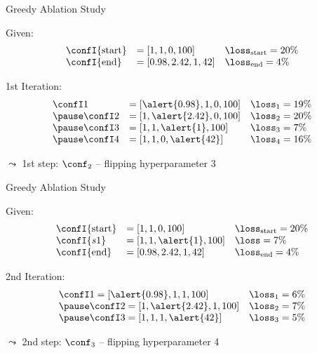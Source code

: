 \begin{frame}[c]{Greedy Ablation Study}

Given:
\begin{eqnarray}
\begin{array}{lll}
\confI{\text{start}} &= [1, 1, 0, 100] & \loss_{\text{start}} = 20\% \nonumber\\
\confI{\text{end}} &= [0.98, 2.42, 1, 42]  & \loss_{\text{end}} = 4\% \nonumber
\end{array}
\end{eqnarray}

\pause
1st Iteration:
\begin{eqnarray}
\begin{array}{lll}
\confI1& = [\alert{0.98}, 1, 0, 100] & \loss_1 = 19\% \nonumber\\
\pause
\confI2 &= [1, \alert{2.42}, 0, 100] & \loss_2 = 20\% \nonumber\\
\pause
\confI3 &= [1, 1, \alert{1}, 100] & \loss_3 = 7\% \nonumber\\
\pause
\confI4 &= [1, 1, 0, \alert{42}] & \loss_4 = 16\% \nonumber\\
\end{array}
\end{eqnarray}

\pause
$\leadsto$ 1st step: $\conf_2$ -- flipping hyperparameter 3


\end{frame}
\begin{frame}[c]{Greedy Ablation Study}

Given:
\begin{eqnarray}
\begin{array}{lll}
\confI{\text{start}} &= [1, 1, 0, 100] & \loss_{\text{start}} = 20\% \nonumber\\
\confI{s1} &= [1, 1, \alert{1}, 100]  & \loss = 7\% \nonumber\\
\confI{\text{end}} &= [0.98, 2.42, 1, 42]  & \loss_{\text{end}} = 4\% \nonumber
\end{array}
\end{eqnarray}

2nd Iteration:
\begin{eqnarray}
\begin{array}{ll}
\confI1 = [\alert{0.98}, 1, 1, 100] & \loss_1 = 6\% \nonumber\\
\pause
\confI2 = [1, \alert{2.42}, 1, 100] & \loss_2 = 7\% \nonumber\\
\pause
\confI3 = [1, 1, 1, \alert{42}] & \loss_3 = 5\% \nonumber\\
\end{array}
\end{eqnarray}

$\leadsto$ 2nd step: $\conf_3$ -- flipping hyperparameter 4

\end{frame}

